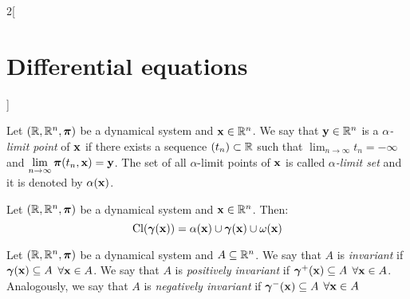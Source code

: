 \documentclass[../../../main.tex]{subfiles}
\begin{document}
\begin{multicols}{2}[\section{Differential equations}]
\begin{definition}
  \end{definition}
  \begin{definition}
    Let $(\mathbb{R},\mathbb{R}^n,\boldsymbol{\mathrm{\pi}})$ be a dynamical system and $\boldsymbol{\mathrm{x}}\in\mathbb{R}^n$. We say that $\boldsymbol{\mathrm{y}}\in\mathbb{R}^n$ is a \textit{$\alpha$-limit point} of $\boldsymbol{\mathrm{x}}$ if there exists a sequence $(t_n)\subset\mathbb{R}$ such that $\displaystyle\lim_{n\to\infty}t_n=-\infty$ and $\displaystyle\lim_{n\to\infty}\boldsymbol{\mathrm{\pi}}(t_n,\boldsymbol{\mathrm{x}})=\boldsymbol{\mathrm{y}}$.
    The set of all $\alpha$-limit points of $\boldsymbol{\mathrm{x}}$ is called \textit{$\alpha$-limit set} and it is denoted by $\alpha(\boldsymbol{\mathrm{x}})$.
  \end{definition}
  \begin{prop}
    Let $(\mathbb{R},\mathbb{R}^n,\boldsymbol{\mathrm{\pi}})$ be a dynamical system and $\boldsymbol{\mathrm{x}}\in\mathbb{R}^n$. Then: $$\operatorname{Cl}(\boldsymbol{\mathrm{\gamma}}(\boldsymbol{\mathrm{x}}))=\alpha(\boldsymbol{\mathrm{x}})\cup\boldsymbol{\mathrm{\gamma}}(\boldsymbol{\mathrm{x}})\cup\omega(\boldsymbol{\mathrm{x}})$$
  \end{prop}
  \begin{definition}
    Let $(\mathbb{R},\mathbb{R}^n,\boldsymbol{\mathrm{\pi}})$ be a dynamical system and $A\subseteq \mathbb{R}^n$. We say that $A$ is \textit{invariant} if $\boldsymbol{\mathrm{\gamma}}(\boldsymbol{\mathrm{x}})\subseteq A$ $\forall\boldsymbol{\mathrm{x}}\in A$. We say that $A$ is \textit{positively invariant} if $\boldsymbol{\mathrm{\gamma}}^+(\boldsymbol{\mathrm{x}})\subseteq A$ $\forall\boldsymbol{\mathrm{x}}\in A$. Analogously, we say that $A$ is \textit{negatively invariant} if $\boldsymbol{\mathrm{\gamma}}^-(\boldsymbol{\mathrm{x}})\subseteq A$ $\forall\boldsymbol{\mathrm{x}}\in A$
  \end{definition}
\end{multicols}
\end{document}
